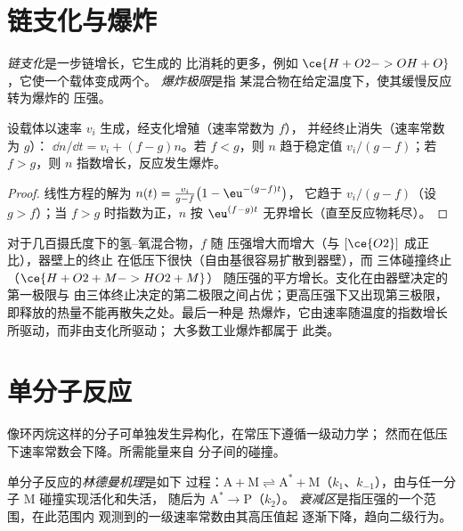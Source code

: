\section{链支化与爆炸}

\begin{definition}\label{def:b3:complex-kinetics:branching}
\emph{链支化}是一步链增长，它生成的
比消耗的更多，例如 $\ce{H + O2 -> OH + O}$，它使一个载体变成两个。
\emph{爆炸极限}是指
某混合物在给定温度下，使其缓慢反应转为爆炸的
压强。
\end{definition}

\begin{proposition}[支化判据]\label{prop:b3:complex-kinetics:branching}
设载体以速率 $v_i$ 生成，经支化增殖（速率常数为 $f$），
并经终止消失（速率常数为 $g$）：
$\dd n/\dd t = v_i + (f - g)n$。若 $f < g$，则 $n$ 趋于稳定值 $v_i/(g - f)$；若
$f > g$，则 $n$ 指数增长，反应发生爆炸。
\end{proposition}

\begin{proof}
线性方程的解为 $n(t) = \frac{v_i}{g - f}\bigl(1 - \eu^{-(g - f)t}\bigr)$，
它趋于 $v_i/(g - f)$（设 $g > f$）；当 $f > g$ 时指数为正，$n$
按 $\eu^{(f - g)t}$ 无界增长（直至反应物耗尽）。
\end{proof}

对于几百摄氏度下的氢–氧混合物，$f$ 随
压强增大而增大（与 $[\ce{O2}]$ 成正比），器壁上的终止
在低压下很快（自由基很容易扩散到器壁），而
三体碰撞终止（$\ce{H + O2 + M -> HO2 + M}$）
随压强的平方增长。支化在由器壁决定的第一极限与
由三体终止决定的第二极限之间占优；更高压强下又出现第三极限，
即释放的热量不能再散失之处。最后一种是
热爆炸，它由速率随温度的指数增长所驱动，而非由支化所驱动；
大多数工业爆炸都属于
此类。

\section{单分子反应}

像环丙烷这样的分子可单独发生异构化，在常压下遵循一级动力学；
然而在低压下速率常数会下降。所需能量来自
分子间的碰撞。

\begin{definition}\label{def:b3:complex-kinetics:lindemann}
单分子反应的\emph{林德曼机理}是如下
过程：$\mathrm{A + M \rightleftharpoons A^* + M}$（$k_1$、$k_{-1}$），由与任一分子 M 碰撞实现活化和失活，
随后为 $\mathrm{A^* \to P}$（$k_2$）。
\emph{衰减区}是指压强的一个范围，在此范围内
观测到的一级速率常数由其高压值起
逐渐下降，趋向二级行为。
\end{definition}

